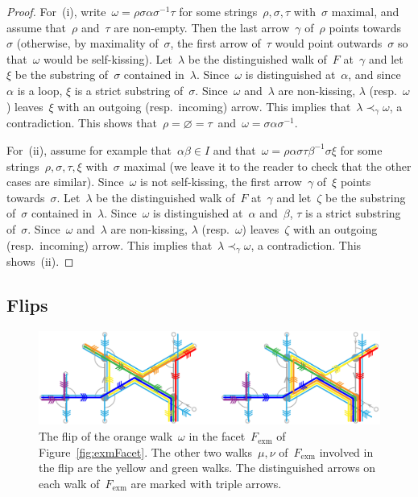 \documentclass{amsart}
\theoremstyle{definition}
\newcommand{\fref}[1]{Figure~\ref{#1}} %
\newcommand{\ex}{_{\textrm{exm}}} %
\begin{document}
\begin{proof}
For~(i), write~$\omega = \rho \sigma \alpha \sigma^{-1} \tau$ for some strings~$\rho, \sigma, \tau$ with~$\sigma$ maximal, and assume that~$\rho$ and~$\tau$ are non-empty.
Then the last arrow~$\gamma$ of~$\rho$ points towards~$\sigma$ (otherwise, by maximality of~$\sigma$, the first arrow of~$\tau$ would point outwards~$\sigma$ so that~$\omega$ would be self-kissing).
Let~$\lambda$ be the distinguished walk of~$F$ at~$\gamma$ and let~$\xi$ be the substring of~$\sigma$ contained in~$\lambda$.
Since~$\omega$ is distinguished at~$\alpha$, and since~$\alpha$ is a loop, $\xi$ is a strict substring of~$\sigma$.
Since~$\omega$ and~$\lambda$ are non-kissing, $\lambda$ (resp.~$\omega$) leaves~$\xi$ with an outgoing (resp.~incoming) arrow.
This implies that~$\lambda \prec_\gamma \omega$, a contradiction.
This shows that~$\rho = \varnothing = \tau$~and~$\omega = \sigma \alpha \sigma^{-1}$.

For~(ii), assume for example that~$\alpha\beta \in I$ and that~$\omega = \rho \alpha \sigma \tau \beta^{-1} \sigma \xi$ for some strings~$\rho, \sigma, \tau, \xi$ with~$\sigma$ maximal (we leave it to the reader to check that the other cases are similar).
Since~$\omega$ is not self-kissing, the first arrow~$\gamma$ of~$\xi$ points towards~$\sigma$.
Let~$\lambda$ be the distinguished walk of~$F$ at~$\gamma$ and let~$\zeta$ be the substring of~$\sigma$ contained in~$\lambda$.
Since~$\omega$ is distinguished at~$\alpha$ and~$\beta$, $\tau$ is a strict substring of~$\sigma$.
Since~$\omega$ and~$\lambda$ are non-kissing, $\lambda$ (resp.~$\omega$) leaves~$\zeta$ with an outgoing (resp.~incoming) arrow.
This implies that~$\lambda \prec_\gamma \omega$, a contradiction.
This shows~(ii).
\end{proof}

\subsection{Flips}
\label{subsec:flips}

\begin{figure}[t]
	\capstart
	\centerline{\includegraphics[scale=.7]{exmFlip}}
	\caption{The flip of the orange walk~$\omega$ in the facet~$F\ex$ of \fref{fig:exmFacet}. The other two walks~$\mu, \nu$ of~$F\ex$ involved in the flip are the yellow and green walks. The distinguished arrows on each walk of~$F\ex$ are marked with triple arrows.}
	\label{fig:exmFlip}
\end{figure}
\end{document}
